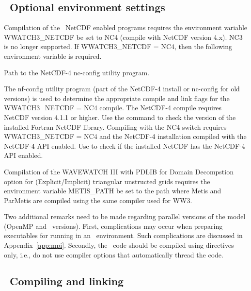 \vssub
\subsection{~Optional environment settings}
\vssub

Compilation of the \ws\ NetCDF enabled programs requires the environment variable
{\code WWATCH3\_NETCDF} be set to {\code NC4} (compile with NetCDF version 4.x).  
{\code NC3} is no longer supported. 
If {\code WWATCH3\_NETCDF = NC4}, then the following environment variable
is required.
\begin{clist}
 {Path to the NetCDF-4 nc-config utility program.}
\end{clist}
The {\file nf-config} utility program (part of the NetCDF-4 install or 
{\file nc-config} for old versions) is used to determine the appropriate
compile and link flags for the {\code WWATCH3\_NETCDF = NC4} compile.
The NetCDF-4 compile requires NetCDF version 4.1.1 or higher.  Use the command
 to check the version of the installed 
Fortran-NetCDF library.  Compiling with the {\code NC4} switch requires
{\code WWATCH3\_NETCDF = NC4} and the NetCDF-4 installation compiled with the
NetCDF-4 API enabled.  Use  to check if the
installed NetCDF has the NetCDF-4 API enabled.

\vspace{\baselineskip} 
\noindent
Compilation of the WAVEWATCH III with PDLIB for Domain Decompstion option
for (Explicit/Implicit) triangular unstructed grids requires the environment
variable {\code METIS\_PATH} be set to the path where {\code Metis} and
{\code ParMetis} are compiled using the same compiler used for WW3.

\vspace{\baselineskip}
\noindent
Two additional remarks need to be made regarding parallel versions of the
model (OpenMP and \mpi\ versions). First, complications may occur when
preparing executables for running in an \mpi\ environment. Such complications
are discussed in Appendix~\ref{app:mpi}. Secondly, the \omp\ code should be
compiled using directives only, i.e., do not use compiler options that
automatically thread the code.



\vssub
\subsection{~Compiling and linking} \label{sec:comp}
\vssub

